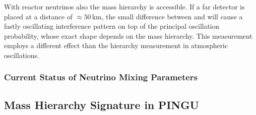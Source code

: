 With reactor neutrinos also the mass hierarchy is accessible. If a far detector
is placed at a distance of $\approx 50$\,km, the small difference between
 and  will cause a fastly oscillating interference pattern on top
of the principal oscillation probability, whose exact shape depends on the mass
hierarchy. This measurement employs a different effect than the hierarchy
measurement in atmospheric oscillations.

\subsubsection{Current Status of Neutrino Mixing Parameters}
\label{sec:MixingParams}

\subsection{Mass Hierarchy Signature in PINGU}
\label{sec:PINGUosc}

